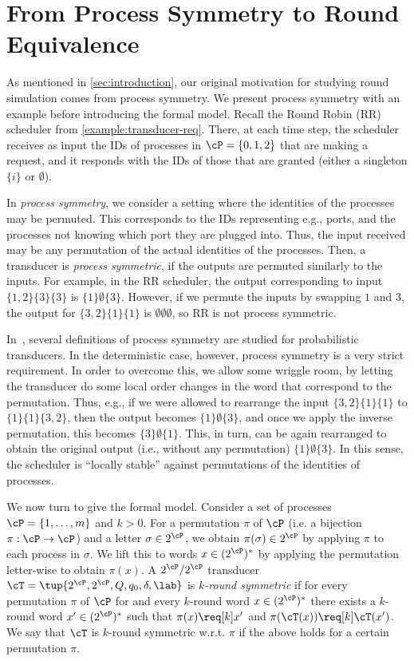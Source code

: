 \chapter{From Process Symmetry to Round Equivalence}
\label{chap:application}

As mentioned in \cref{sec:introduction}, our original motivation for studying round simulation comes from process symmetry. We present process symmetry with an example before introducing the formal model.
Recall the Round Robin (RR) scheduler from \cref{example:transducer-req}. There, at each time step, the scheduler receives as input the IDs of processes in $\cP=\{0,1,2\}$ that are making a request, and it responds with the IDs of those that are granted (either a singleton $\{i\}$ or $\emptyset$).

In \emph{process symmetry}, we consider a setting where the identities of the processes may be permuted. This corresponds to the IDs representing e.g., ports, and the processes not knowing which port they are plugged into. Thus, the input received may be any permutation of the actual identities of the processes. Then, a transducer is \emph{process symmetric}, if the outputs are permuted similarly to the inputs. For example, in the RR scheduler, the output corresponding to input $\{1,2\}\{3\}\{3\}$ is $\{1\}\emptyset\{3\}$. However, if we permute the inputs by swapping $1$ and $3$, the output for $\{3,2\}\{1\}\{1\}$ is $\emptyset\emptyset\emptyset$, so RR is not process symmetric.

In~\cite{Almagor2020b}, several definitions of process symmetry are studied for probabilistic transducers. In the deterministic case, however, process symmetry is a very strict requirement. In order to overcome this, we allow some wriggle room, by letting the transducer do some local order changes in the word that correspond to the permutation. Thus, e.g., if we were allowed to rearrange the input $\{3,2\}\{1\}\{1\}$ to $\{1\}\{1\}\{3,2\}$, then the output becomes $\{1\}\emptyset\{3\}$, and once we apply the inverse permutation, this becomes $\{3\}\emptyset\{1\}$. This, in turn, can be again rearranged to obtain the original output (i.e., without any permutation) $\{1\}\emptyset\{3\}$.
In this sense, the scheduler is ``locally stable'' against permutations of the identities of processes.

We now turn to give the formal model.
Consider a set of processes $\cP=\{1,\dots,m\}$ and $k>0$. For a permutation $\pi$ of $\cP$ (i.e. a bijection $\pi:\cP\to \cP$) and a letter $\sigma\in 2^{\cP}$, we obtain $\pi(\sigma)\in 2^{\cP}$ by applying $\pi$ to each process in $\sigma$. We lift this to words $x\in (2^{\cP})^*$ by applying the permutation letter-wise to obtain $\pi(x)$.
A $2^\cP/2^\cP$ transducer $\cT=\tup{2^\cP,2^\cP,Q,q_0,\delta,\lab}$ is \emph{$k$-round symmetric} if for every permutation $\pi$ of $\cP$ for and every $k$-round word $x\in (2^{\cP})^*$ there exists a $k$-round word $x' \in (2^{\cP})^*$ such that $\pi(x)\req[k] x'$ and $\pi(\cT(x))\req[k] \cT(x')$.
We say that $\cT$ is $k$-round symmetric w.r.t. $\pi$ if the above holds for a certain permutation $\pi$.

